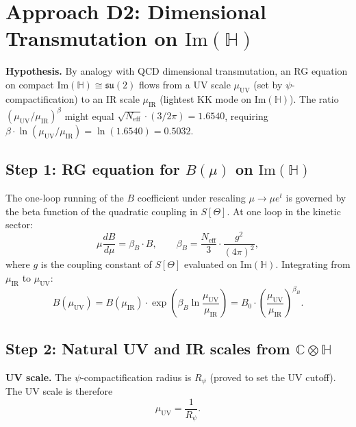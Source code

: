 \documentclass[11pt,a4paper]{article}
\theoremstyle{definition}
\theoremstyle{remark}
\begin{document}
\section{Approach D2: Dimensional Transmutation on $\mathrm{Im}(\mathbb{H})$}
\label{sec:D2_dimtrans}

\textbf{Hypothesis.}
By analogy with QCD dimensional transmutation, an RG equation on
compact $\mathrm{Im}(\mathbb{H}) \cong \mathfrak{su}(2)$ flows from a UV scale
$\mu_{\mathrm{UV}}$ (set by $\psi$-compactification) to an IR scale
$\mu_{\mathrm{IR}}$ (lightest KK mode on $\mathrm{Im}(\mathbb{H})$).
The ratio $(\mu_{\mathrm{UV}}/\mu_{\mathrm{IR}})^\beta$ might equal
$\sqrt{N_{\mathrm{eff}}} \cdot (3/2\pi) = 1.6540$, requiring
$\beta \cdot \ln(\mu_{\mathrm{UV}}/\mu_{\mathrm{IR}}) = \ln(1.6540) = 0.5032$.

\subsection{Step 1: RG equation for $B(\mu)$ on $\mathrm{Im}(\mathbb{H})$}

The one-loop running of the $B$ coefficient under rescaling $\mu \to \mu e^t$ is
governed by the beta function of the quadratic coupling in $S[\Theta]$.
At one loop in the kinetic sector:
\begin{equation}
  \mu \frac{d B}{d\mu} = \beta_B \cdot B,
  \qquad
  \beta_B = \frac{N_{\mathrm{eff}}}{3} \cdot \frac{g^2}{(4\pi)^2},
  \label{eq:RG_B}
\end{equation}
where $g$ is the coupling constant of $S[\Theta]$ evaluated on $\mathrm{Im}(\mathbb{H})$.
Integrating from $\mu_{\mathrm{IR}}$ to $\mu_{\mathrm{UV}}$:
\begin{equation}
  B(\mu_{\mathrm{UV}}) = B(\mu_{\mathrm{IR}}) \cdot \exp\!\left(\beta_B
    \ln\frac{\mu_{\mathrm{UV}}}{\mu_{\mathrm{IR}}}\right)
  = B_0 \cdot \left(\frac{\mu_{\mathrm{UV}}}{\mu_{\mathrm{IR}}}\right)^{\!\beta_B}.
  \label{eq:B_running}
\end{equation}

\subsection{Step 2: Natural UV and IR scales from $\mathbb{C}\otimes\mathbb{H}$}

\textbf{UV scale.}
The $\psi$-compactification radius is $R_\psi$ (proved to set the UV cutoff).
The UV scale is therefore
\begin{equation}
  \mu_{\mathrm{UV}} = \frac{1}{R_\psi}.
  \label{eq:mu_UV}
\end{equation}
\end{document}
